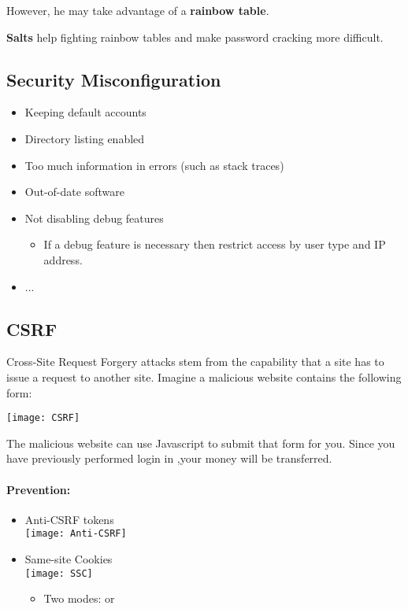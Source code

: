 \documentclass[../ESOF_notes.tex]{subfiles}
\begin{document}
However, he may take advantage of a \textbf{rainbow table}.

\textbf{Salts} help fighting rainbow tables and make password cracking more difficult.

\subsection{Security Misconfiguration}

\begin{itemize}
    \item Keeping default accounts
    \item Directory listing enabled
    \item Too much information in errors (such as stack traces)
    \item Out-of-date software
    \item Not disabling debug features
    \begin{itemize}
        \item If a debug feature is necessary then restrict access by user type and IP address.
    \end{itemize}
    \item ...
\end{itemize}

\subsection{CSRF}

Cross-Site Request Forgery attacks stem from the capability that a site has to issue a request to another site. Imagine a malicious website contains the following form:

\begin{center}
    \texttt{[image: CSRF]}
\end{center}

The malicious website can use Javascript to submit that form for you. Since you have previously performed login in ,your money will be transferred.

\paragraph{Prevention:}
\begin{itemize}
    \item Anti-CSRF tokens \mbox{}\\
    \texttt{[image: Anti-CSRF]}
    \item Same-site Cookies \mbox{}\\
    \texttt{[image: SSC]}
    \begin{itemize}
    \item Two modes:  or 
    \end{itemize}
\end{itemize}
\end{document}

